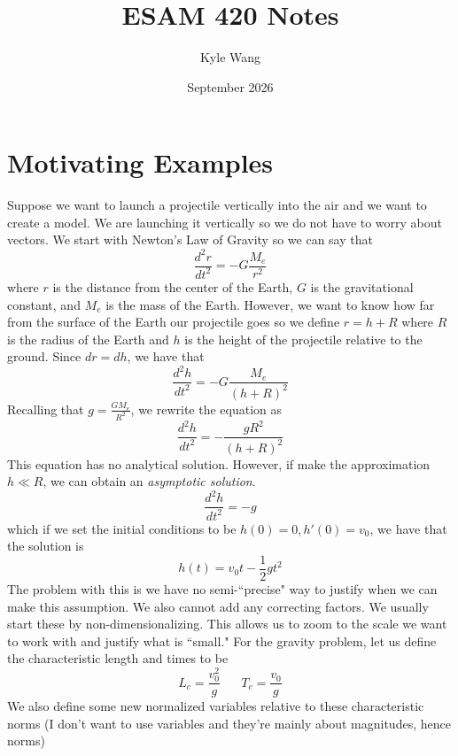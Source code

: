 \documentclass{article}
\title{ESAM 420 Notes}
\author{Kyle Wang}
\date{September 2026}
\newcommand{\odt}[2]{\frac{d^2 #1}{d #2 ^2}}
\newcommand{\twen}{\hspace{20pt}}
\begin{document}
\maketitle
\tableofcontents
\section{Motivating Examples}
Suppose we want to launch a projectile vertically into the air and we want to create a model. We are launching it vertically so we do not have to worry about vectors. We start with Newton's Law of Gravity so we can say that 
\begin{equation*}
    \odt{r}{t} =-G\frac{M_e }{r^2}
\end{equation*}
where $r$ is the distance from the center of the Earth, $G$ is the gravitational constant, and $M_e$ is the mass of the Earth. However, we want to know how far from the surface of the Earth our projectile goes so we define $r=h+R$ where $R$ is the radius of the Earth and $h$ is the height of the projectile relative to the ground. Since $dr=dh$, we have that 
\begin{equation*}
    \odt{h}{t} = - G\frac{M_e}{(h+R)^2} 
\end{equation*}
Recalling that $g=\frac{GM_e}{R^2}$, we rewrite the equation as 
\begin{equation*}
    \odt{h}{t} = -\frac{gR^2}{(h+R)^2}
\end{equation*}
This equation has no analytical solution. However, if make the approximation $h\ll R$, we can obtain an \emph{asymptotic solution}. 
\begin{equation*}
    \odt{h}{t} = -g 
\end{equation*}
which if we set the initial conditions to be $h(0) = 0, h'(0) = v_0$, we have that the solution is 
\begin{equation*}
    h(t) = v_0t-\frac{1}{2}gt^2
\end{equation*}
The problem with this is we have no semi-``precise" way to justify when we can make this assumption. We also cannot add any correcting factors. We usually start these by non-dimensionalizing. This allows us to zoom to the scale we want to work with and justify what is ``small." For the gravity problem, let us define the characteristic length and times to be 
\begin{equation*}
    L_c = \frac{v_0^2}{g} \twen T_c= \frac{v_0}{g}
\end{equation*}
We also define some new normalized variables relative to these characteristic norms (I don't want to use variables and they're mainly about magnitudes, hence norms)
\end{document}
